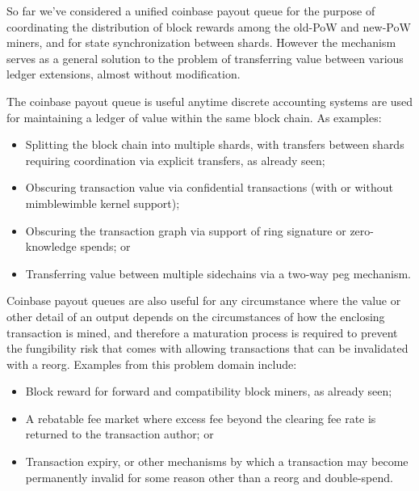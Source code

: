 So far we've considered a unified coinbase payout queue for the
purpose of coordinating the distribution of block rewards among the
old-PoW and new-PoW miners, and for state synchronization between
shards.  However the mechanism serves as a general solution to the
problem of transferring value between various ledger extensions,
almost without modification.

The coinbase payout queue is useful anytime discrete accounting
systems are used for maintaining a ledger of value within the same
block chain.  As examples:

\begin{itemize}

  \item

    Splitting the block chain into multiple shards, with transfers
    between shards requiring coordination via explicit transfers, as
    already seen;

  \item

    Obscuring transaction value via confidential transactions (with or
    without mimblewimble kernel support);

  \item

    Obscuring the transaction graph via support of ring signature or
    zero-knowledge spends; or

  \item

    Transferring value between multiple sidechains via a two-way peg
    mechanism.

\end{itemize}

Coinbase payout queues are also useful for any circumstance where the
value or other detail of an output depends on the circumstances of how
the enclosing transaction is mined, and therefore a maturation process
is required to prevent the fungibility risk that comes with allowing
transactions that can be invalidated with a reorg.  Examples from this
problem domain include:

\begin{itemize}

  \item

    Block reward for forward and compatibility block miners, as
    already seen;

  \item

    A rebatable fee market where excess fee beyond the clearing fee
    rate is returned to the transaction author; or

  \item

    Transaction expiry, or other mechanisms by which a transaction may
    become permanently invalid for some reason other than a reorg and
    double-spend.

\end{itemize}

